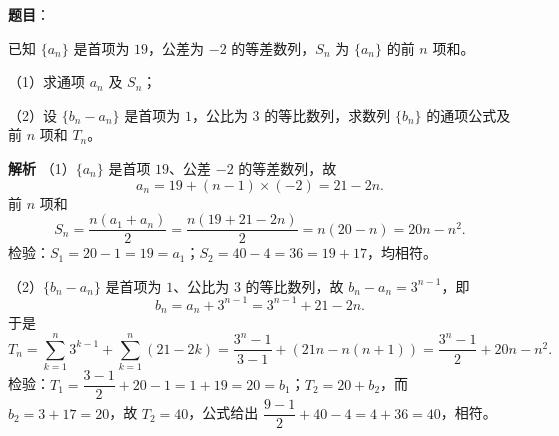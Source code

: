\begin{answer}

\textbf{题目}：

已知 $\{a_n\}$ 是首项为 $19$，公差为 $-2$ 的等差数列，$S_n$ 为 $\{a_n\}$ 的前 $n$ 项和。

（1）求通项 $a_n$ 及 $S_n$；

（2）设 $\{b_n-a_n\}$ 是首项为 $1$，公比为 $3$ 的等比数列，求数列 $\{b_n\}$ 的通项公式及前 $n$ 项和 $T_n$。

\textbf{解析}
（1）$\{a_n\}$ 是首项 $19$、公差 $-2$ 的等差数列，故
\nopagebreak[4]
\[a_n=19+(n-1)\times(-2)=21-2n.\]
前 $n$ 项和
\nopagebreak[4]
\[S_n=\frac{n(a_1+a_n)}{2}=\frac{n\left(19+21-2n\right)}{2}=n(20-n)=20n-n^2.\]
检验：$S_1=20-1=19=a_1$；$S_2=40-4=36=19+17$，均相符。

（2）$\{b_n-a_n\}$ 是首项为 $1$、公比为 $3$ 的等比数列，故 $b_n-a_n=3^{n-1}$，即
\nopagebreak[4]
\[b_n=a_n+3^{n-1}=3^{n-1}+21-2n.\]
于是
\nopagebreak[4]
\[T_n=\sum_{k=1}^{n}3^{k-1}+\sum_{k=1}^{n}(21-2k)=\frac{3^n-1}{3-1}+\left(21n-n(n+1)\right)=\frac{3^n-1}{2}+20n-n^2.\]
检验：$T_1=\dfrac{3-1}{2}+20-1=1+19=20=b_1$；$T_2=20+b_2$，而 $b_2=3+17=20$，故 $T_2=40$，公式给出 $\dfrac{9-1}{2}+40-4=4+36=40$，相符。


\end{answer}
